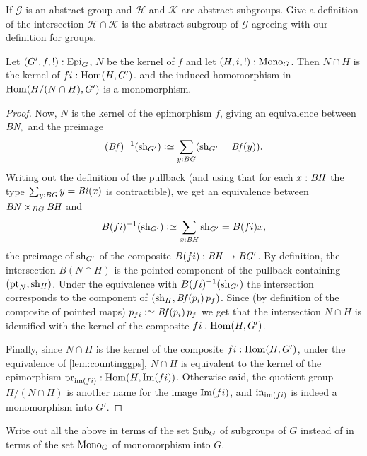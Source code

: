 \begin{xca}
  If $\mathcal G$ is an abstract group and $\mathcal H$ and $\mathcal K$ are abstract subgroups.  Give a definition of the intersection $\mathcal H\cap\mathcal K$ is the abstract subgroup of $\mathcal G$ agreeing with our definition for groups.
\end{xca}
\begin{lemma}
  \label{lem:whatSylow2needs}
  Let $(G',f,!):\mathrm{Epi}_G$, $N$ be the kernel of $f$  and let $(H,i,!):\mathrm{Mono}_G$.  Then
$N\cap H$ is the kernel of $fi:\Hom(H,G')$.  %
and the induced homomorphism in $\Hom(H/(N\cap H),G')$ is a monomorphism.
  \begin{proof}
Now, $N$ is the kernel of the epimorphism $f$, giving an equivalence between $\BN_\div$ and the preimage
$$(\Bf)^{-1}(\sh_{G'})\defequi\sum_{y:\BG}(\sh_{G'}=\Bf(y)).$$
Writing out the definition of the pullback (and using that for each $x:\mathit{B}\mathit{H}$ the type $\sum_{y:\mathit{B}\mathit{G}}y=\mathit{B}\mathit{i}(x)$ is contractible), we get an equivalence between $\mathit{B}\mathit{N}\times_{\mathit{B}\mathit{G}}\mathit{B}\mathit{H}$ and
$$B(fi)^{-1}(\sh_{G'})\defequi\sum_{x:\BH}\sh_{G'}=B(fi)x,$$
the preimage of $\mathrm{sh}_{G'}$ of the composite $B(fi):\mathit{B}\mathit{H}\to \mathit{B}\mathit{G}'$.
 By definition, the intersection $B(N\cap H)$ is the pointed component of the pullback containing $(\mathrm{pt}_N,\mathrm{sh}_H)$.  Under the equivalence with $B(fi)^{-1}(\mathrm{sh}_{G'})$ the intersection corresponds to the component of $(\sh_H,\Bf(p_i)\,p_f)%
 $.
Since (by definition of the composite of pointed maps) $p_{fi}\defequi \Bf(p_i)\,p_f$ we get that the intersection $N\cap H$ is identified with the kernel of the composite $fi:\Hom(H,G')$.

Finally, since $N\cap H$ is the kernel of the composite $fi:\Hom(H,G')$, under the equivalence of \cref{lem:countinggps}, $N\cap H$ is equivalent to the kernel of the epimorphism $\prj_{\img(fi)}:\Hom(H,\image (fi))$.  Otherwise said, the quotient group $H/(N\cap H)$ is another name for the image $\Img (fi)$, and $\incl_{\img(fi)}$ is indeed a monomorphism into $G'$.
  \end{proof}
\end{lemma}
\begin{xca}
  Write out all the above in terms of the set $\mathrm{Sub}_G$ of subgroups of $G$ instead of in terms of the set $\mathrm{Mono}_G$ of monomorphism into $G$.
\end{xca}


